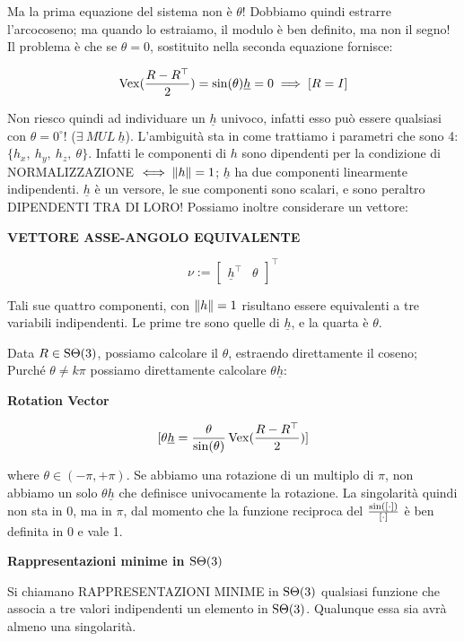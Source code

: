Ma la prima equazione del sistema non è $\theta$! Dobbiamo quindi estrarre l'arcocoseno; ma quando lo estraiamo, il modulo è ben definito, ma non il segno! Il problema è che se $\theta=0$, sostituito nella seconda equazione fornisce:

\[
	\operatorname{Vex}(\frac{R-R^\top}{2}) = \sin(\theta)\underline{h} = 0 \implies [R=I]
\]

Non riesco quindi ad individuare un $\underline{h}$ univoco, infatti esso può essere qualsiasi con $\theta=0^{\circ}$! ($\exists\ MUL\ \underline{h}$). L'ambiguità sta in come trattiamo i parametri che sono 4: $\{h_x,\ h_y,\ h_z,\ \theta\}$. Infatti le componenti di $h$ sono dipendenti per la condizione di NORMALIZZAZIONE $\iff \lVert h\rVert=1$; $\underline{h}$ ha due componenti linearmente indipendenti. $\underline{h}$ è un versore, le sue componenti sono scalari, e sono peraltro DIPENDENTI TRA DI LORO! Possiamo inoltre considerare un vettore:

\begin{defn}{\textbf{VETTORE ASSE-ANGOLO EQUIVALENTE}}

\[
	\nu:=\begin{bmatrix}\underline{h}^\top&\theta\end{bmatrix}^\top
\]

Tali sue quattro componenti, con $\lVert h\rVert=1$ risultano essere equivalenti a tre variabili indipendenti. Le prime tre sono quelle di $\underline{h}$, e la quarta è $\theta$.

\end{defn}

Data $R\in\operatorname{S\Theta}(3)$, possiamo calcolare il $\theta$, estraendo direttamente il coseno; Purché $\theta\neq k\pi$ possiamo direttamente calcolare $\theta\underline{h}$:

\begin{defn}{\textbf{Rotation Vector}}

\[
	[\theta\underline{h} = \frac{\theta}{\sin(\theta)}\operatorname{Vex}(\frac{R-R^\top}{2})]
\]

\end{defn}

where $\theta\in(-\pi,+\pi)$. Se abbiamo una rotazione di un multiplo di $\pi$, non abbiamo un solo $\theta\underline{h}$ che definisce univocamente la rotazione. La singolarità quindi non sta in 0, ma in $\pi$, dal momento che la funzione reciproca del $\frac{\sin([\mathord{\cdot}])}{[\mathord{\cdot}]}$ è ben definita in 0 e vale 1.


\begin{defn}{\textbf{Rappresentazioni minime in $\operatorname{S\Theta}(3)$}}

Si chiamano RAPPRESENTAZIONI MINIME in $\operatorname{S\Theta}(3)$ qualsiasi funzione che associa a tre valori indipendenti un elemento in $\operatorname{S\Theta}(3)$. Qualunque essa sia avrà almeno una singolarità.

\end{defn}

